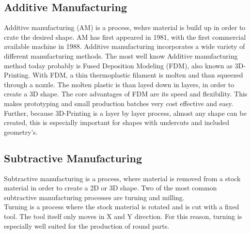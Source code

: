 \subsection{Additive Manufacturing}
Additive manufacturing (AM) is a process, wehre material is build up in order to crate the desired shape. AM has first appeared in 1981, with the first commercial available machine in 1988.
Additive manufacturing incorporates a wide variety of different manufacturing methods. The most well know Additive manufacturing method today probably is Fused Deposition Modeling (FDM), also known as 3D-Printing.
With FDM, a thin thermoplastic filament is molten and than squeezed through a nozzle. The molten plastic is than layed down in layers, in order to create a 3D shape.
The core advantages of FDM are its speed and flexibility. This makes prototyping and small production batches very cost effective and easy. 
Further, because 3D-Printing is a layer by layer process, almost any shape can be created, this is especially important for shapes with undercuts and included geometry's.\cite{FraunhoferInstitutAM}

\subsection{Subtractive Manufacturing}
Subtractive manufacturing is a process, where material is removed from a stock material in order to create a 2D or 3D shape. Two of the most common subtractive manufacturing processes are turning and milling.\\
Turning is a process where the stock material is rotated and is cut with a fixed tool. The tool itself only moves in X and Y direction. For this reason, turning is especially well suited for the production of round parts.





